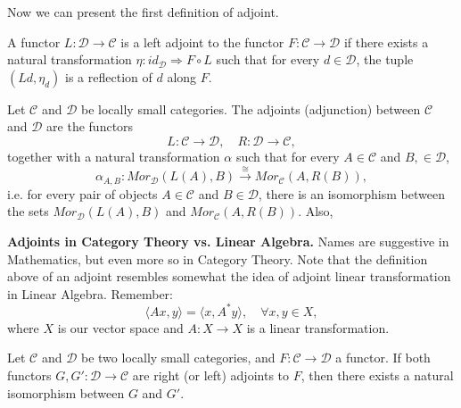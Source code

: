 Now we can present the first definition of adjoint.
\begin{definition}[Adjoint]
	A functor $L:\mathcal D \to \mathcal C$ is a left adjoint to the functor
	$F:\mathcal C \to \mathcal D$ if there exists a natural transformation
	$\eta:id_{\mathcal D} \Rightarrow F \circ L$ such that for every
	$d \in \mathcal D$, the tuple $(Ld, \eta_d)$ is a reflection of $d$
	along $F$.
\end{definition}

\begin{definition}[Ajdoint]
	Let $\mathcal C$ and $\mathcal D$ be locally small categories. The adjoints (adjunction) between
	$\mathcal C$ and $\mathcal D$ are the functors
	\begin{displaymath}
		L:\mathcal C \to \mathcal D, \quad R:\mathcal D \to \mathcal C,
	\end{displaymath}
	together with a natural transformation $\alpha$ such that for every
	$A \in \mathcal C$ and $B, \in \mathcal D$,
	\begin{displaymath}
		\alpha_{A,B}: Mor_\mathcal D (L(A), B) \overset{\cong}{\longrightarrow} Mor_\mathcal C (A, R(B)),
	\end{displaymath}
	i.e. for every pair of objects $A \in \mathcal C$  and $B \in \mathcal D$, there is an isomorphism
	between the sets $Mor_\mathcal D(L(A), B)$ and $Mor_\mathcal C (A, R(B))$.
	Also,
\end{definition}

\begin{shaded}
	\textbf{Adjoints in Category Theory vs. Linear Algebra.} Names are suggestive in Mathematics,
	but even more so in Category Theory. Note that the definition above of an adjoint resembles
	somewhat the idea of adjoint linear transformation in Linear Algebra. Remember:
	\begin{displaymath}
		\langle A x, y \rangle  = \langle x, A^* y \rangle, \quad \forall x,y \in X,
	\end{displaymath}
	where $X$ is our vector space and $A: X \to X$ is a linear transformation.
\end{shaded}

\begin{proposition}
	Let $\mathcal C$ and $\mathcal D$ be two locally small categories, and $F:\mathcal C \to \mathcal D$
	a functor. If both functors $G,G':\mathcal D \to \mathcal C$ are right (or left) adjoints
	to $F$, then there exists a natural isomorphism between $G$ and $G'$.
\end{proposition}
